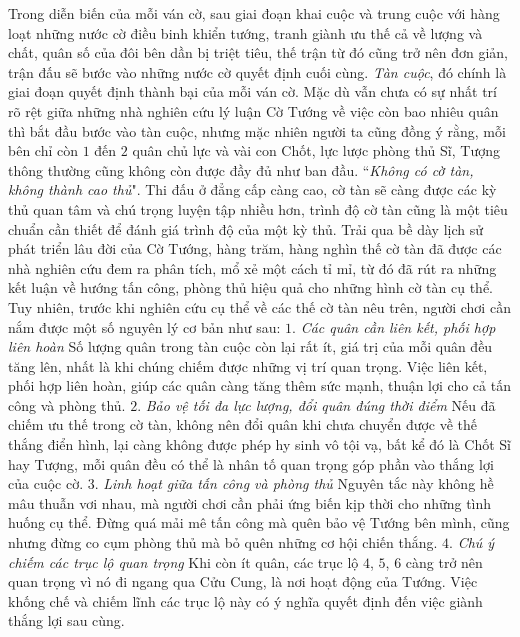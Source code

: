 \vspace*{190pt}
\begin{multicols}{2}
	Trong diễn biến của mỗi ván cờ, sau giai đoạn khai cuộc và trung cuộc với hàng loạt những nước cờ điều binh khiển tướng, tranh giành ưu thế cả về lượng và chất, quân số của đôi bên dần bị triệt tiêu, thế trận từ đó cũng trở nên đơn giản, trận đấu sẽ bước vào những nước cờ quyết định cuối cùng. \textit{Tàn cuộc}, đó chính là giai đoạn quyết định thành bại của mỗi ván cờ. Mặc dù vẫn chưa có sự nhất trí rõ rệt giữa những nhà nghiên cứu lý luận Cờ Tướng về việc còn bao nhiêu quân thì bắt đầu bước vào tàn cuộc, nhưng mặc nhiên người ta cũng đồng ý rằng, mỗi bên chỉ còn $1$ đến $2$ quân chủ lực và vài con Chốt, lực lược phòng thủ Sĩ, Tượng thông thường cũng không còn được đầy đủ như ban đầu.
	\vskip 0.1cm
	``\textit{Không có cờ tàn, không thành cao thủ}". Thi đấu ở đẳng cấp càng cao, cờ tàn sẽ càng được các kỳ thủ quan tâm và chú trọng luyện tập nhiều hơn, trình độ cờ tàn cũng là một tiêu chuẩn cần thiết để đánh giá trình độ của một kỳ thủ. Trải qua bề dày lịch sử phát triển lâu đời của Cờ Tướng, hàng trăm, hàng nghìn thế cờ tàn đã được các nhà nghiên cứu đem ra phân tích, mổ xẻ một cách tỉ mỉ, từ đó đã rút ra những kết luận về hướng tấn công, phòng thủ hiệu quả cho những hình cờ tàn cụ thể. Tuy nhiên, trước khi nghiên cứu cụ thể về các thế cờ tàn nêu trên, người chơi cần nắm được một số nguyên lý cơ bản như sau:
	\vskip 0.1cm
	$1.$ \textit{Các quân cần liên kết, phối hợp liên hoàn}
	\vskip 0.1cm
	Số lượng quân trong tàn cuộc còn lại rất ít, giá trị của mỗi quân đều tăng lên, nhất là khi chúng chiếm được những vị trí quan trọng. Việc liên kết,  phối hợp liên hoàn, giúp các quân càng tăng thêm sức mạnh, thuận lợi cho cả tấn công và phòng thủ. 
	\vskip 0.1cm
	$2.$ \textit{Bảo vệ tối đa lực lượng, đổi quân đúng thời điểm}
	\vskip 0.1cm
	Nếu đã chiếm ưu thế trong cờ tàn, không nên đổi quân khi chưa chuyển được về thế thắng điển hình, lại càng không được phép hy sinh vô tội vạ, bất kể đó là Chốt Sĩ hay Tượng, mỗi quân đều có thể là nhân tố quan trọng góp phần vào thắng lợi của cuộc cờ.
	\vskip 0.1cm
	$3.$ \textit{Linh hoạt giữa tấn công và phòng thủ}
	\vskip 0.1cm
	Nguyên tắc này không hề mâu thuẫn vơi nhau, mà người chơi cần phải ứng biến kịp thời cho những tình huống cụ thể. Đừng quá mải mê tấn công mà quên bảo vệ Tướng bên mình, cũng nhưng đừng co cụm phòng thủ mà bỏ quên những cơ hội chiến thắng.
	\vskip 0.1cm
	$4.$ \textit{Chú ý chiếm các trục lộ quan trọng}
	\vskip 0.1cm
	Khi còn ít quân, các trục lộ $4$, $5$, $6$ càng trở nên quan trọng vì nó đi ngang qua Cửu Cung, là nơi hoạt động của Tướng. Việc khống chế và chiếm lĩnh các trục lộ này có ý nghĩa quyết định đến việc giành thắng lợi sau cùng.

\end{multicols}
